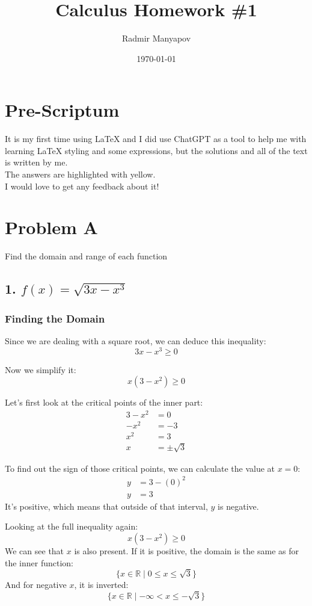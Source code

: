 \documentclass{article}
\begin{document}
\title{Calculus Homework \#1}
\author{Radmir Manyapov}
\date{\today}
\maketitle

\section*{Pre-Scriptum}
It is my first time using LaTeX and I did use ChatGPT as a tool to help me with learning LaTeX styling and some expressions, but the solutions and all of the text is written by me. \\
The answers are highlighted with yellow. \\
I would love to get any feedback about it!

\section*{Problem A}
Find the domain and range of each function

\subsection*{1. $f(x) = \sqrt{3x - x^3}$}

\subsubsection*{Finding the Domain}
Since we are dealing with a square root, we can deduce this inequality:
\[
3x - x^3 \geq 0
\]

Now we simplify it:
\[
x(3 - x^2) \geq 0
\]

Let's first look at the critical points of the inner part:
\[
\begin{aligned}
3 - x^2 &= 0 \\
-x^2 &= -3 \\
x^2 &= 3 \\
x &= \pm\sqrt{3}
\end{aligned}
\]

To find out the sign of those critical points, we can calculate the value at \(x = 0\):
\[
\begin{aligned}
y &= 3 - (0)^2 \\
y &= 3
\end{aligned}
\]
It's positive, which means that outside of that interval, \(y\) is negative.

Looking at the full inequality again:
\[
x(3 - x^2) \geq 0
\]
We can see that \(x\) is also present. If it is positive, the domain is the same as for the inner function:
\[
\{ x \in \mathbb{R} \mid 0 \leq x \leq \sqrt{3} \}
\]
And for negative \(x\), it is inverted:
\[
\{ x \in \mathbb{R} \mid -\infty < x \leq -\sqrt{3} \}
\]
\end{document}
